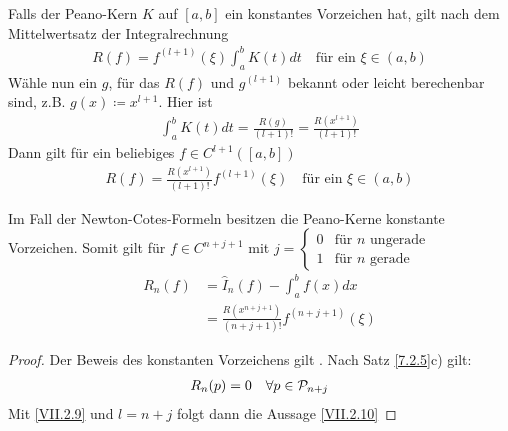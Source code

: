\documentclass[ngerman,fontsize=11pt, paper=a4, parskip=half, titlepage=true, toc=bib]{scrbook}
\begin{document}
\begin{Fole}\label{7.2.7}
  Falls der Peano-Kern $K$ auf $[a,b]$ ein konstantes Vorzeichen hat,
  gilt nach dem Mittelwertsatz der Integralrechnung
  \begin{gather}
    R(f) = f^{(l+1)}(\xi) \int_a^b K(t)dt 
    \quad \text{für ein }\xi\in (a,b)
    \label{VII.2.8}
  \end{gather}
  Wähle nun ein $g$, für das $R(f)$ und $g^{(l+1)}$ bekannt oder leicht
  berechenbar sind, z.B.
  $g(x)\coloneqq x^{l+1}$. Hier ist
  \begin{gather*}
    \int_a^bK(t)dt = \frac{R(g)}{(l+1)!} = \frac{R(x^{l+1})}{(l+1)!}
  \end{gather*}
  Dann gilt für ein beliebiges $f\in C^{l+1}([a,b])$
  \begin{gather}
    R(f) = \frac{R(x^{l+1})}{(l+1)!} f^{(l+1)}(\xi)
    \quad \text{für ein }\xi \in (a,b)
    \label{VII.2.9}
  \end{gather}
\end{Fole}

\begin{Satze}[Approximationsfehler]
  Im Fall der Newton-Cotes-Formeln besitzen die Peano-Kerne
  konstante Vorzeichen. Somit gilt für $f\in C^{n+j+1}$ mit 
  $j= \begin{cases}
    0 & \text{für $n$ ungerade}\\
    1 & \text{für $n$ gerade}
  \end{cases}$
  \begin{align}\nonumber
    R_n(f) &= \hat{I}_n (f) - \int_a^b f(x) dx\\
           &= \frac{R(x^{n+j+1})}{(n+j+1)!}f^{(n+j+1)}(\xi)
             \label{VII.2.10}
  \end{align}

  \begin{proof}
    Der Beweis des konstanten Vorzeichens gilt
    \cite[siehe][]{steffensen}.
    Nach Satz \ref{7.2.5}c) gilt:
    \begin{gather*}
      R_n(p) = 0 \quad\forall p\in\mathcal{P}_{n+j}
    \end{gather*}
    Mit \eqref{VII.2.9} und $l=n+j$ folgt dann die Aussage \eqref{VII.2.10}
  \end{proof}
\end{Satze}
\end{document}
